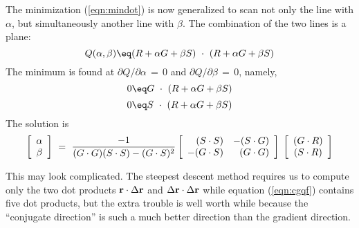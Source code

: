 \par
The minimization (\ref{eqn:mindot}) is now generalized
to scan not only the line with $\alpha$,
but simultaneously another line with $\beta$.
The combination of the two lines is a plane:
\begin{equation}
Q(\alpha ,\beta ) \eq
( R + \alpha G + \beta S) \ \cdot\  (R + \alpha G + \beta S )
\label{eqn:cgqf}
\end{equation}
The minimum is found at  $\partial Q / \partial \alpha \,=\,0$  and
$\partial Q / \partial \beta \,=\,0$, namely,
\begin{equation}
0\eq G \ \cdot\  ( R + \alpha G + \beta S )
\end{equation}
\begin{equation}
0\eq S \ \cdot\  ( R + \alpha G + \beta S )
\end{equation}
The solution is
\begin{equation}
\label{eqn:twobytwosln}
\left[ 
\begin{array}{c}
  \alpha \\ 
  \beta \end{array} \right] 
\ = \ 
        {-1 \over (G\cdot G)(S\cdot S)-(G\cdot S)^2}
\left[ 
\begin{array}{rr}
  (S \cdot S) & -(S \cdot G)  \\
  -(G \cdot S) & (G \cdot G)  \end{array} \right] 
\; \left[ 
\begin{array}{c}
  (G\cdot R) \\
  (S\cdot R) \end{array} \right]
\end{equation}

This may look complicated.
The steepest descent method requires us to compute
only the two dot products
$       \bold r \cdot \Delta \bold r$ and
$\Delta \bold r \cdot \Delta \bold r$
while equation (\ref{eqn:cgqf}) contains five dot products,
but the extra trouble is well worth while because the ``conjugate direction''
is such a much better direction than the gradient direction.

